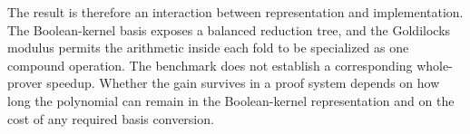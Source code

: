 The result is therefore an interaction between representation and
implementation.  The Boolean-kernel basis exposes a balanced reduction
tree, and the Goldilocks modulus permits the arithmetic inside each fold to
be specialized as one compound operation.  The benchmark does not establish
a corresponding whole-prover speedup.  Whether the gain survives in a
proof system depends on how long the polynomial can remain in the
Boolean-kernel representation and on the cost of any required basis
conversion.
